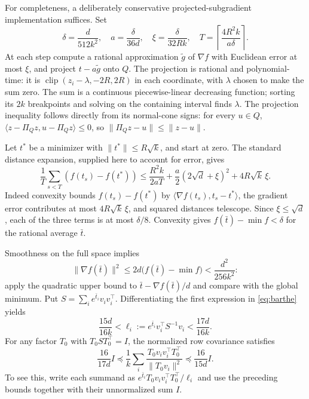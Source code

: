 For completeness, a deliberately conservative projected-subgradient implementation suffices. Set
\[
 \delta=\frac{d}{512k^2},\quad a=\frac{\delta}{36d},\quad
 \xi=\frac{\delta}{32Rk},\quad
 T=\left\lceil\frac{4R^2k}{a\delta}\right\rceil.
\]
At each step compute a rational approximation $\widetilde g$ of $\nabla f$ with Euclidean error at most $\xi$, and project $t-a\widetilde g$ onto $Q$. The projection is rational and polynomial-time: it is $\operatorname{clip}(z_i-\lambda,-2R,2R)$ in each coordinate, with $\lambda$ chosen to make the sum zero. The sum is a continuous piecewise-linear decreasing function; sorting its $2k$ breakpoints and solving on the containing interval finds $\lambda$. The projection inequality follows directly from its normal-cone signs: for every $u\in Q$, $\langle z-\Pi_Qz,u-\Pi_Qz\rangle\le0$, so $\|\Pi_Qz-u\|\le\|z-u\|$.

Let $t^*$ be a minimizer with $\|t^*\|\le R\sqrt k$, and start at zero. The standard distance expansion, supplied here to account for error, gives
\[
 \frac1T\sum_{s<T}(f(t_s)-f(t^*))
 \le \frac{R^2k}{2aT}
 +\frac a2(2\sqrt d+\xi)^2+4R\sqrt k\,\xi.
\]
Indeed convexity bounds $f(t_s)-f(t^*)$ by $\langle\nabla f(t_s),t_s-t^*\rangle$, the gradient error contributes at most $4R\sqrt k\,\xi$, and squared distances telescope. Since $\xi\le\sqrt d$, each of the three terms is at most $\delta/8$. Convexity gives $f(\bar t)-\min f<\delta$ for the rational average $\bar t$.

Smoothness on the full space implies
\[
 \|\nabla f(\bar t)\|^2\le2d\bigl(f(\bar t)-\min f\bigr)
 <\frac{d^2}{256k^2}:
\]
apply the quadratic upper bound to $\bar t-\nabla f(\bar t)/d$ and compare with the global minimum. Put $S=\sum_i e^{\bar t_i}v_iv_i^\top$. Differentiating the first expression in \eqref{eq:barthe} yields
\[
 \frac{15d}{16k}<\ell_i:=e^{\bar t_i}v_i^\top S^{-1}v_i<\frac{17d}{16k}.
\]
For any factor $T_0$ with $T_0ST_0^\top=I$, the normalized row covariance satisfies
\[
 \frac{16}{17d}I\preceq
 \frac1k\sum_i\frac{T_0v_i v_i^\top T_0^\top}{\|T_0v_i\|^2}
 \preceq\frac{16}{15d}I.
\]
To see this, write each summand as $e^{\bar t_i}T_0v_iv_i^\top T_0^\top/\ell_i$ and use the preceding bounds together with their unnormalized sum $I$.

